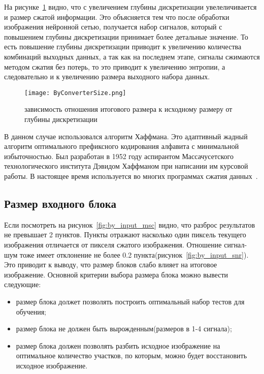 На рисунке~\ref{fig:by_converter_size} видно, что с увеличением глубины дискретизации увелеличивается и размер сжатой информации.
Это объясняется тем что после обработки изображения нейронной сетью, получается набор сигналов, который с повышением глубины дискретизации
принимает более детальные значение. То есть повышение глубины дискретизации приводит к увеличению количества комбинаций выходных данных,
а так как на последнем этапе, сигналы сжимаются методом сжатия без потерь, то это приводит к увеличению энтропии, а следовательно и к увеличению
размера выходного набора данных.

\begin{figure}[ht]
\centering
  \texttt{[image: ByConverterSize.png]}
  \caption{ зависимость отношения итогового размера к исходному размеру от глубины дискретизации }
  \label{fig:by_converter_size}
\end{figure}

В данном случае использовался алгоритм Хаффмана. Это адаптивный жадный алгоритм оптимального префиксного
кодирования алфавита с минимальной избыточностью. Был разработан в 1952 году аспирантом Массачусетского технологического
института Дэвидом Хаффманом при написании им курсовой работы. В настоящее время используется во многих программах сжатия данных~\cite{kormen}.

\subsection{Размер входного блока}
\label{sub:analysis:input}

Если посмотреть на рисунок~\ref{fig:by_input_msc} видно, что разброс результатов не превышает 2 пунктов. Пункты отражают насколько
один пиксель текущего изображения отличается от пикселя сжатого изображения. Отношение сигнал-шум тоже имеет отклонение не более 0.2 пункта(рисунок~\ref{fig:by_input_snr}).
Это приводит к выводу, что размер блоков слабо влияет на итоговое изображение. Основной критерии выбора размера блока можно вывести следующие:
\begin{itemize}
  \item размер блока должет позволять построить оптимальный набор тестов для обучения;
  \item размер блока не должен быть вырожденным(размеров в 1-4 сигнала);
  \item размер блока должен позволять разбить исходное изображение на оптимальное количество участков,
  по которым, можно будет восстановить исходное изображение.
\end{itemize}

